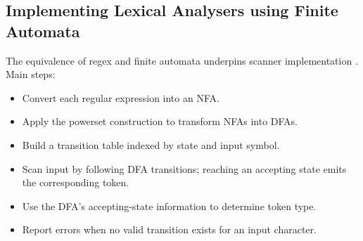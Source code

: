 \subsection{Implementing Lexical Analysers using Finite Automata}

The equivalence of regex and finite automata underpins scanner implementation \cite{aho2007compilers}. Main steps:
\begin{itemize}
  \item Convert each regular expression into an NFA.
  \item Apply the powerset construction to transform NFAs into DFAs.
  \item Build a transition table indexed by state and input symbol.
  \item Scan input by following DFA transitions; reaching an accepting state emits the corresponding token.
  \item Use the DFA’s accepting-state information to determine token type.
  \item Report errors when no valid transition exists for an input character.
\end{itemize}




